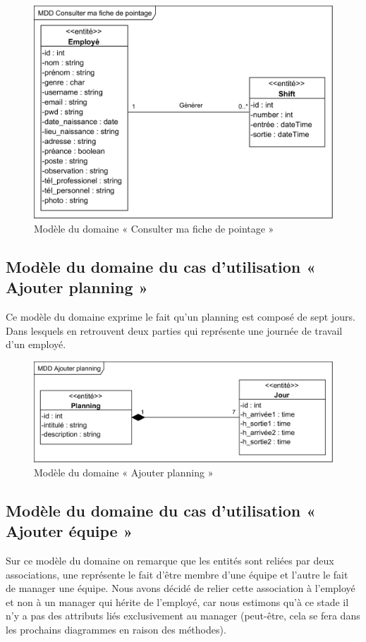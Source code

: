 \clearpage

\begin{figure}[h!]
    \centering
    \includegraphics[scale=1.168]{images/MDD/MDD Consulter ma fiche de pointage.png}
    \caption{Modèle du domaine « Consulter ma fiche de pointage »}
    \label{fig13}
\end{figure}
            
\subsection*{Modèle du domaine du cas d'utilisation « Ajouter planning »}
Ce modèle du domaine exprime le fait qu’un planning est composé de sept jours. 
Dans lesquels en retrouvent deux parties qui représente une journée de travail 
d’un employé.

\begin{figure}[h!]
    \centering
    \includegraphics[scale=1.12]{images/MDD/MDD Ajouter planning.png}
    \caption{Modèle du domaine « Ajouter planning »}
    \label{fig14}
\end{figure}
        
\subsection*{Modèle du domaine du cas d'utilisation « Ajouter équipe »}
Sur ce modèle du domaine on remarque que les entités sont reliées par 
deux associations, une représente le fait d’être membre d’une équipe et 
l’autre le fait de manager une équipe. Nous avons décidé de relier cette 
association à l’employé et non à un manager qui hérite de l’employé, car 
nous estimons qu’à ce stade il n’y a pas des attributs liés exclusivement 
au manager (peut-être, cela se fera dans les prochains diagrammes en 
raison des méthodes).  

